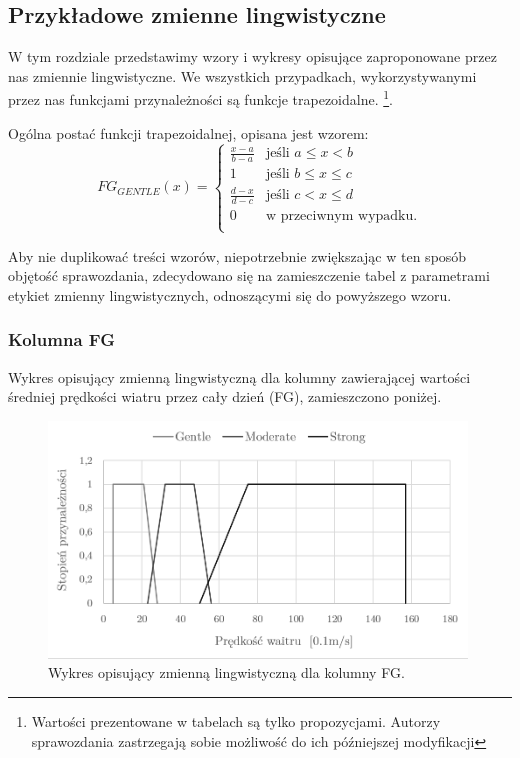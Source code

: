 \documentclass{classrep}
\begin{document}
\subsection{Przykładowe zmienne lingwistyczne}
W tym rozdziale przedstawimy wzory i wykresy opisujące zaproponowane przez nas zmiennie lingwistyczne. We wszystkich przypadkach, wykorzystywanymi przez nas funkcjami przynależności są funkcje trapezoidalne.  \footnote{Wartości prezentowane w tabelach są tylko propozycjami. Autorzy sprawozdania zastrzegają sobie możliwość do ich późniejszej modyfikacji}.\newline

Ogólna postać funkcji trapezoidalnej, opisana jest wzorem:
\begin{equation}
{FG}_{GENTLE}(x)= \left\{ \begin{array}{ll}
\frac{x-a}{b-a} 	& \textrm{jeśli $a \leq x < b$} \\
1 			& \textrm{jeśli $b \leq x \leq c$} \\
\frac{d-x}{d-c} 	& \textrm{jeśli $c < x \leq d$} \\
0 			& \textrm{w przeciwnym wypadku.} \\
\end{array} \right.
\end{equation}

Aby nie duplikować treści wzorów, niepotrzebnie zwiększając w ten sposób objętość sprawozdania, zdecydowano się na zamieszczenie tabel z parametrami etykiet zmienny lingwistycznych, odnoszącymi się do powyższego wzoru.



\subsubsection{Kolumna FG}
Wykres opisujący zmienną lingwistyczną dla kolumny zawierającej wartości średniej prędkości wiatru przez cały dzień (FG), zamieszczono poniżej.
\begin{figure}[H]
	\centering
	\includegraphics[width=0.99\textwidth]{Pictures/TermsCharts/FG.png}
	\caption{Wykres opisujący zmienną lingwistyczną dla kolumny FG.}
\end{figure}
\end{document}
